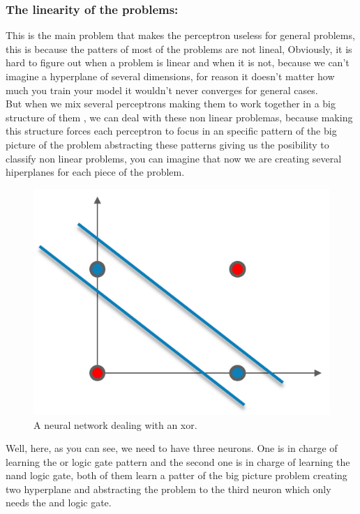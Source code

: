 \documentclass[12pt]{article}
\begin{document}
\subsubsection{The linearity of the problems:}
This is the main problem that makes the perceptron useless for general problems, this is
because the patters of most of the problems are not lineal, Obviously, it is hard to figure out when
a problem is linear and when it is not, because we can't imagine a hyperplane of several dimensions,
for reason it doesn't matter how much you train your model it wouldn't never converges for
general cases.\\
But when we mix several perceptrons making them to work together in a big structure of them
, we can deal with these non linear problemas, because making this structure forces each
perceptron to focus in an specific pattern of the big picture of the problem abstracting these patterns
giving us the posibility to classify non linear problems, you can imagine that now we are creating
several hiperplanes for each piece of the problem.\\
\begin{figure}[H]
  \centering
  \includegraphics[scale = 0.5]{xor.png}
  \caption{A neural network dealing with an xor.}
\end{figure}
Well, here, as you can see, we need to have three neurons. One is in charge of learning the or
logic gate pattern and the second one is in charge of learning the nand logic gate, both of
them learn a patter of the big picture problem creating two hyperplane and abstracting the problem
to the third neuron which only needs the and logic gate.
\end{document}
